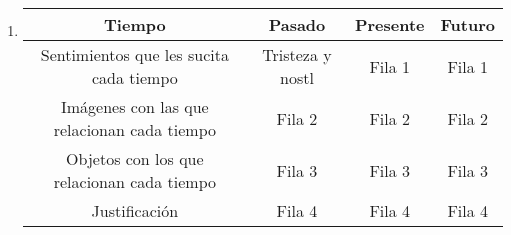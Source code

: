 \documentclass[10pt, a4paper]{article}
\begin{document}
\begin{enumerate}
      \item 
        \begin{table}[h]
        \centering
        \begin{tabular}{|c|c|c|c|}
        \hline
        Tiempo & Pasado & Presente & Futuro \\ \hline
        Sentimientos que les sucita cada tiempo & Tristeza y nostl & Fila 1 & Fila 1 \\
        Imágenes con las que relacionan cada tiempo & Fila 2 & Fila 2 & Fila 2 \\
        Objetos con los que relacionan cada tiempo & Fila 3 & Fila 3 & Fila 3 \\
        Justificación & Fila 4 & Fila 4 & Fila 4 \\ \hline
        \end{tabular}
        \end{table}
    \end{enumerate}
    
\end{document}
